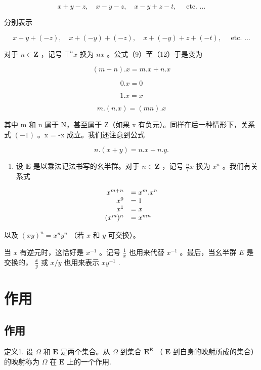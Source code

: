 \[
x + y - z, \quad x - y - z, \quad x - y + z - t, \quad \text { etc. } \dots
\]

分别表示

\[
x + y + (- z), \quad x + (- y) + (- z), \quad x + (- y) + z + (- t), \quad \text { etc. } \dots
\]

对于 \(n \in \mathbf{Z}\) ，记号 \(\top^n x\) 换为 \(nx\) 。公式（9）至（12）于是变为

\[
(m + n). x = m. x + n. x\tag{13}
\]

\[
0. x = 0\tag{14}
\]

\[
1. x = x\tag{15}
\]

\[
m. (n. x) = (m n). x\tag{16}
\]

其中 m 和 n 属于 N，甚至属于 Z（如果 x 有负元）。同样在后一种情形下，关系式 \((-1)\) 。x = -x 成立。我们还注意到公式

\[
n. (x + y) = n. x + n. y.\tag{17}
\]

\begin{enumerate}
\def\labelenumi{(\alph{enumi})}
\setcounter{enumi}{1}
\tightlist
\item
  设 \(\mathbf{E}\) 是以乘法记法书写的幺半群。对于 \(n \in \mathbf{Z}\) ，记号 \(\frac{n}{T} x\) 换为 \(x^n\) 。我们有关系式
\end{enumerate}

\[
\begin{array}{r l} x ^ {m + n} & = x ^ {m}. x ^ {n} \\ x ^ {0} & = 1 \\ x ^ {1} & = x \\ (x ^ {m}) ^ {n} & = x ^ {m n} \end{array}
\]

以及 \((xy)^n = x^n y^n\) （若 \(x\) 和 \(y\) 可交换）。

当 \(x\) 有逆元时，这恰好是 \(x^{-1}\) 。记号 \(\frac{1}{x}\) 也用来代替 \(x^{-1}\) 。最后，当幺半群 \(E\) 是交换的， \(\frac{x}{y}\) 或 \(x / y\) 也用来表示 \(xy^{-1}\) .

\section{作用}

\subsection{作用}

定义1. 设 \(\Omega\) 和 \(\mathbf{E}\) 是两个集合。从 \(\Omega\) 到集合 \(\mathbf{E}^{\mathbf{E}}\) （ \(\mathbf{E}\) 到自身的映射所成的集合）的映射称为 \(\Omega\) 在 \(\mathbf{E}\) 上的一个作用.

